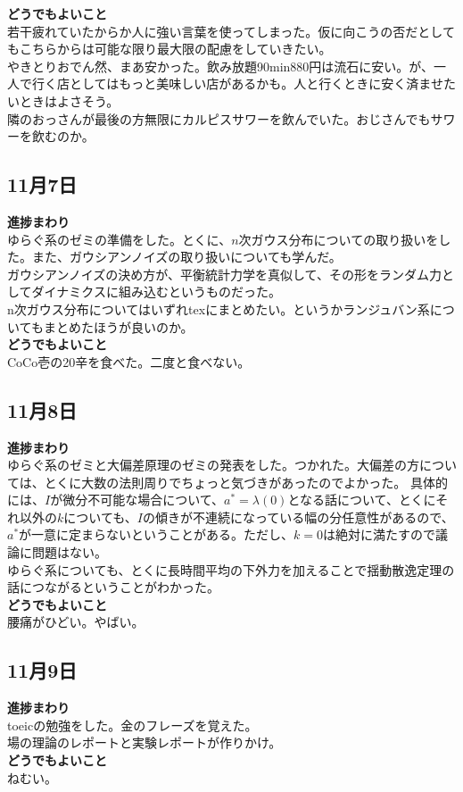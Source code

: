 \documentclass[a4paper,11pt]{jsarticle}
\numberwithin{equation}{section}
\begin{document}
\textbf{どうでもよいこと} \\
若干疲れていたからか人に強い言葉を使ってしまった。仮に向こうの否だとしてもこちらからは可能な限り最大限の配慮をしていきたい。\\
やきとりおでん然、まあ安かった。飲み放題90min880円は流石に安い。が、一人で行く店としてはもっと美味しい店があるかも。人と行くときに安く済ませたいときはよさそう。\\
隣のおっさんが最後の方無限にカルピスサワーを飲んでいた。おじさんでもサワーを飲むのか。\\

\subsection*{11月7日}
\textbf{進捗まわり} \\
ゆらぐ系のゼミの準備をした。とくに、$n$次ガウス分布についての取り扱いをした。また、ガウシアンノイズの取り扱いについても学んだ。\\
ガウシアンノイズの決め方が、平衡統計力学を真似して、その形をランダム力としてダイナミクスに組み込むというものだった。\\
n次ガウス分布についてはいずれtexにまとめたい。というかランジュバン系についてもまとめたほうが良いのか。\\
\textbf{どうでもよいこと} \\
CoCo壱の20辛を食べた。二度と食べない。\\

\subsection*{11月8日}
\textbf{進捗まわり} \\
ゆらぐ系のゼミと大偏差原理のゼミの発表をした。つかれた。大偏差の方については、とくに大数の法則周りでちょっと気づきがあったのでよかった。
具体的には、$I$が微分不可能な場合について、$a^*= \lambda(0)$となる話について、とくにそれ以外の$k$についても、$I$の傾きが不連続になっている幅の分任意性があるので、$a^*$が一意に定まらないということがある。ただし、$k=0$は絶対に満たすので議論に問題はない。\\
ゆらぐ系についても、とくに長時間平均の下外力を加えることで揺動散逸定理の話につながるということがわかった。\\
\textbf{どうでもよいこと} \\
腰痛がひどい。やばい。\\

\subsection*{11月9日}
\textbf{進捗まわり} \\
toeicの勉強をした。金のフレーズを覚えた。\\
場の理論のレポートと実験レポートが作りかけ。\\
\textbf{どうでもよいこと} \\
ねむい。\\
\end{document}

